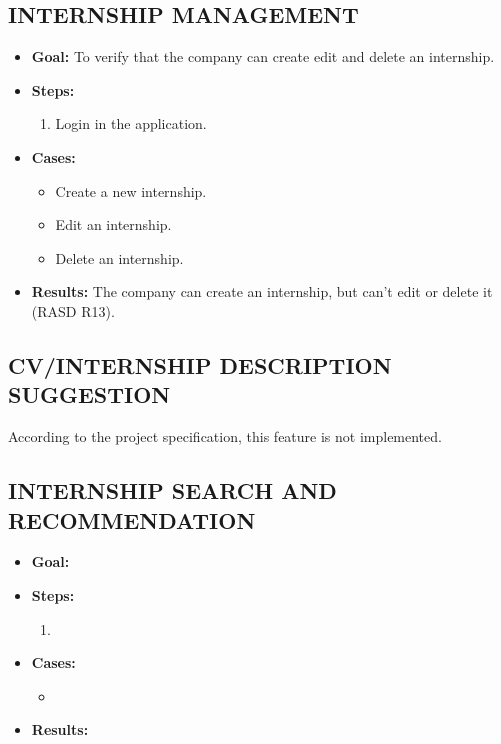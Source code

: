 \subsection{INTERNSHIP MANAGEMENT}\label{subsec:internship-management}
\begin{itemize}
    \item \textbf{Goal:} To verify that the company can create edit and delete an internship.

    \item \textbf{Steps:}
    \begin{enumerate}
        \item Login in the application.

    \end{enumerate}
    \item \textbf{Cases:}
    \begin{itemize}
        \item Create a new internship.
        \item Edit an internship.
        \item Delete an internship.
    \end{itemize}
    \item \textbf{Results:} The company can create an internship, but can't edit or delete it (RASD R13).

\end{itemize}

\subsection{CV/INTERNSHIP DESCRIPTION SUGGESTION}\label{subsec:cv-internship-description-suggestion}
According to the project specification, this feature is not implemented.


\subsection{INTERNSHIP SEARCH AND RECOMMENDATION}\label{subsec:internship-search-and-recommendation}
\begin{itemize}
    \item \textbf{Goal:}

    \item \textbf{Steps:}
    \begin{enumerate}
        \item

    \end{enumerate}
    \item \textbf{Cases:}
    \begin{itemize}
        \item
    \end{itemize}
    \item \textbf{Results:}

\end{itemize}


